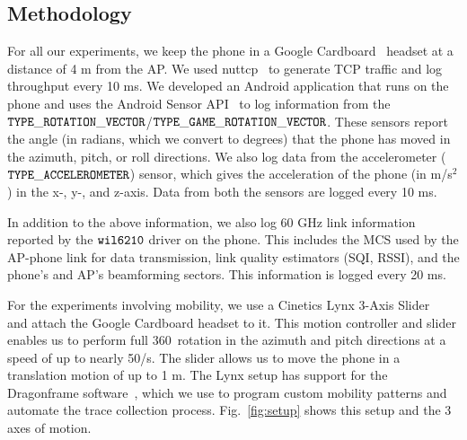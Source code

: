 \documentclass[sigconf,anonymous]{acmart}
\begin{document}






\subsection{Methodology}

For all our experiments, we keep the phone in a Google
Cardboard~\cite{cardboard} headset at a distance of 4 m from the
AP. We used nuttcp~\cite{nuttcp} to generate TCP traffic and log
throughput every 10 ms. We developed an Android application that runs
on the phone and uses the Android Sensor API~\cite{android-sensor} to
log information from the
$\tt{TYPE\_ROTATION\_VECTOR}$/$\tt{TYPE\_GAME\_ROTATION\_VECTOR}$. These
sensors report the angle (in radians, which we convert to degrees) that the
phone has moved in the azimuth, pitch, or roll directions. We also log
data from the accelerometer ($\tt{TYPE\_ACCELEROMETER}$) sensor, which
gives the acceleration of the phone (in m/s$^2$) in the x-, y-, and
z-axis. Data from both the sensors are logged every 10 ms.

In addition to the above information, we also log 60 GHz link information reported by the $\tt{wil6210}$ driver on the phone. This includes the MCS used by the AP-phone link for data transmission, link quality estimators (SQI, RSSI), and the phone's and AP's beamforming sectors. This information is logged every 20 ms.

For the experiments involving mobility, we use a Cinetics Lynx 3-Axis Slider~\cite{cinetics-lynx} and attach the Google Cardboard headset to it. This motion controller and slider enables us to perform full 360\degree~rotation in the azimuth and pitch directions at a speed of up to nearly 50\degree/s. The slider allows us to move the phone in a translation motion of up to 1 m. The Lynx setup has support for the Dragonframe software~\cite{dragonframe}, which we use to program custom mobility patterns and automate the trace collection process. Fig.~\ref{fig:setup} shows this setup and the 3 axes of motion.
\end{document}
